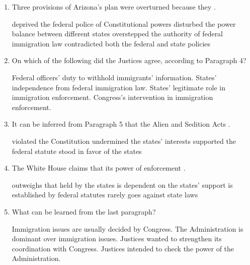 \begin{enumerate}[resume]
	\item
Three provisions of Arizona's plan were overturned because
they \lineread.


\fourchoices
{deprived the federal police of Constitutional powers}
{disturbed the power balance between different states}
{overstepped the authority of federal immigration law}
{contradicted both the federal and state policies}



\item
On which of the following did the Justices agree, according
to Paragraph 4?


\fourchoices
{Federal officers' duty to withhold immigrants' information.}
{States' independence from federal immigration law.}
{States' legitimate role in immigration enforcement.}
{Congress's intervention in immigration enforcement.}



\item
It can be inferred from Paragraph 5 that the Alien and
Sedition Acts \lineread.


\fourchoices
{violated the Constitution}
{undermined the states' interests}
{supported the federal statute}
{stood in favor of the states}


\item
The White House claims that its power of enforcement \lineread.


\fourchoices
{outweighs that held by the states}
{is dependent on the states' support}
{is established by federal statutes}
{rarely goes against state laws}


\item
What can be learned from the last paragraph?


\fourchoices
{Immigration issues are usually decided by Congress.}
{The Administration is dominant over immigration issues.}
{Justices wanted to strengthen its coordination with Congress.}
{Justices intended to check the power of the Administration.}



	
\end{enumerate}


\newpage

